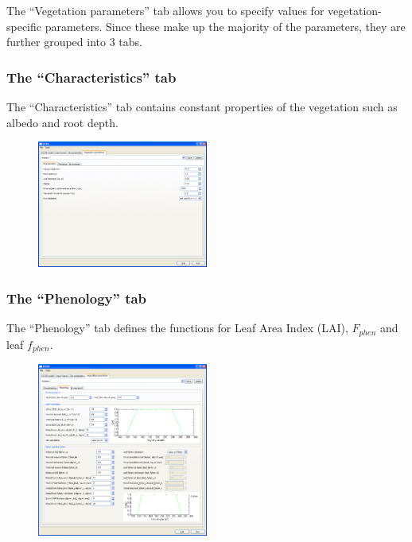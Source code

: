 \documentclass[10pt,a4paper]{article}
\begin{document}
The ``Vegetation parameters'' tab allows you to specify values for vegetation-specific parameters.  
Since these make up the majority of the parameters, they are further grouped into 3 tabs.

\subsubsection{The ``Characteristics'' tab}

The ``Characteristics'' tab contains constant properties of the vegetation such as albedo and root 
depth.

\begin{figure}[!htb]
\centering
\includegraphics[width=0.5\textwidth]{images/ss/veg-characteristics-panel}
\end{figure}

\subsubsection{The ``Phenology'' tab}

The ``Phenology'' tab defines the functions for Leaf Area Index (LAI), $F_{phen}$ and leaf 
$f_{phen}$.

\begin{figure}[!htb]
\centering
\includegraphics[width=0.5\textwidth]{images/ss/veg-phenology-panel}
\end{figure}
\end{document}
